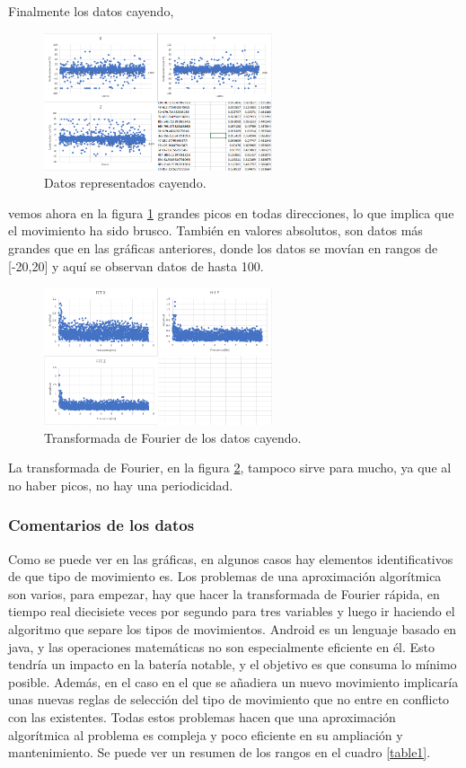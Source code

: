 \documentclass[12pt]{article}
\numberwithin{equation}{section}
\begin{document}
Finalmente los datos cayendo,
\begin{figure}[h]
    \centering
    \includegraphics[width=0.6\textwidth]{cayendoraw.png}
    \caption{Datos representados cayendo.}
    \label{fig:cayendoraw}
\end{figure}
vemos ahora en la figura \ref{fig:cayendoraw} grandes picos en todas direcciones, lo que implica que el movimiento ha sido brusco. También en valores absolutos, son datos más grandes que en las gráficas anteriores, donde los datos se movían en rangos de [-20,20] y aquí se observan datos de hasta 100.

\begin{figure}[h]
    \centering
    \includegraphics[width=0.6\textwidth]{cayendofft.png}
    \caption{Transformada de Fourier de los datos cayendo.}
    \label{fig:cayendofft}
\end{figure}

La transformada de Fourier, en la figura \ref{fig:cayendofft}, tampoco sirve para mucho, ya que al no haber picos, no hay una periodicidad.

\subsubsection{Comentarios de los datos}

Como se puede ver en las gráficas, en algunos casos hay elementos identificativos de que tipo de movimiento es. Los problemas de una aproximación algorítmica son varios, para empezar, hay que hacer la transformada de Fourier rápida, en tiempo real diecisiete veces por segundo para tres variables y luego ir haciendo el algoritmo que separe los tipos de movimientos. Android es un lenguaje basado en java, y las operaciones matemáticas no son especialmente eficiente en él. Esto tendría un impacto en la batería notable, y el objetivo es que consuma lo mínimo posible. Además, en el caso en el que se añadiera un nuevo movimiento implicaría unas nuevas reglas de selección del tipo de movimiento que no entre en conflicto con las existentes. Todas estos problemas hacen que una aproximación algorítmica al problema es compleja y poco eficiente en su ampliación y mantenimiento. Se puede ver un resumen de los rangos en el cuadro \ref{table1}.
\end{document}
